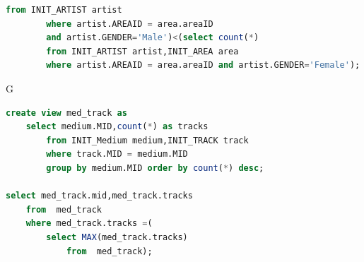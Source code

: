 \documentclass[11pt]{article} %
\begin{document}
{\begin{lstlisting}[language=SQL, keywordstyle=\color{blue!70},
commentstyle=\color{red!50!green!50!blue!50},
rulesepcolor=\color{red!20!green!20!blue!20},
frame=shadowbox]
		from INIT_ARTIST artist
		where artist.AREAID = area.areaID
		and artist.GENDER='Male')<(select count(*)
		from INIT_ARTIST artist,INIT_AREA area
		where artist.AREAID = area.areaID and artist.GENDER='Female');
\end{lstlisting}
G
\begin{lstlisting}[language=SQL, keywordstyle=\color{blue!70},
commentstyle=\color{red!50!green!50!blue!50},
rulesepcolor=\color{red!20!green!20!blue!20},
frame=shadowbox]
create view med_track as
	select medium.MID,count(*) as tracks
		from INIT_Medium medium,INIT_TRACK track
		where track.MID = medium.MID
		group by medium.MID order by count(*) desc;

select med_track.mid,med_track.tracks
	from  med_track 
	where med_track.tracks =(
  		select MAX(med_track.tracks)
  			from  med_track);
\end{lstlisting}


}
\end{document}
